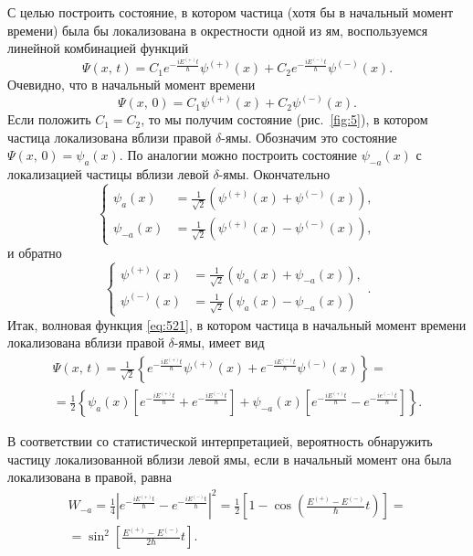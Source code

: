 \documentclass[a4paper]{article}
\begin{document}
\begin{sol}
С целью построить состояние, в котором частица (хотя бы в начальный
момент времени) была бы локализована в окрестности одной из ям,
воспользуемся линейной комбинацией функций
\begin{equation}
	\Psi(x,\,t)= C_1 e^{- \frac{i E^{(+)}t}{\hbar }}
	\psi^{(+)}(x) +C_2 e^{- \frac{i E^{(-)}t}{\hbar }}\psi^{(-)}(x)
\label{eq:521}
.\end{equation}
Очевидно, что в начальный момент времени
\[
	\Psi(x,\,0)=C_1 \psi^{(+)}(x)+C_2 \psi^{(-)}(x)
.\] 
Если положить $C_1=C_2$, то мы получим состояние (рис.~\ref{fig:5}), в котором частица локализована вблизи правой $\delta$-ямы.
Обозначим это состояние $\Psi(x,\,0)=\psi_a(x)$. По аналогии
можно построить состояние $\psi_{-a}(x)$ с локализацией частицы
вблизи левой $\delta$-ямы. Окончательно
\[
\left\{
\begin{aligned}
	\psi_a(x)&= \frac{1}{\sqrt{2} }\left( \psi^{(+)}(x)+
	\psi^{(-)}(x)\right) ,\\
		\psi_{-a}(x)&= \frac{1}{\sqrt{2} }\left( \psi^{(+)}(x)-
	\psi^{(-)}(x)\right),
\end{aligned}
\right.
\]
и обратно
\[
\left\{
\begin{aligned}
	\psi^{(+)}(x)&= \frac{1}{\sqrt{2} }\left( \psi_a (x)+
	\psi_{-a}(x)\right),\\
		\psi^{(-)}(x)&= \frac{1}{\sqrt{2} }\left( \psi_a(x)-
	\psi_{-a}(x)\right) 
\end{aligned}
\right.
.\] 
Итак, волновая функция \eqref{eq:521}, в котором частица в
начальный момент времени локализована вблизи правой $\delta$-ямы,
имеет вид
\begin{multline*}
	\Psi(x,\,t)= \frac{1}{\sqrt{2} }\left\{ e^{- \frac{i E
	^{(+)}t}{\hbar }}\psi^{(+)}(x)+e^{- \frac{i E^{(-)}t}{\hbar }}\psi^{(-)}(x) \right\} =\\=
	\frac{1}{2}\left\{ \psi_a(x) \left[ 
	e^{- \frac{i E^{(+)}t}{\hbar }}+ e ^{- \frac{i E^{(-)}t}{
	\hbar }}\right] +\psi_{-a}(x) \left[ e^{- \frac{i E^{(+)}
	t}{\hbar }}- e^{-\frac{i e^{(-)}t}{\hbar }} \right]  \right\} 
.\end{multline*} 

В соответствии со статистической интерпретацией, вероятность обнаружить
частицу локализованной вблизи левой ямы, если в начальный момент
она была локализована в правой, равна
\begin{multline*}
W_{-a}= \frac{1}{4} \left| e^{- \frac{i E^{(+)}t}{\hbar }}-
e^{- \frac{i E^{(-)}t}{\hbar }}\right| ^2= \frac{1}{2}\left[ 
1- \cos \left( \frac{E^{(+)}-E^{(-)}}{\hbar }t \right) \right] =\\=
\sin^2 \left[ \frac{E^{(+)}-E^{(-)}}{2\hbar }t \right] 
.\end{multline*} 
\end{sol}
\end{document}
